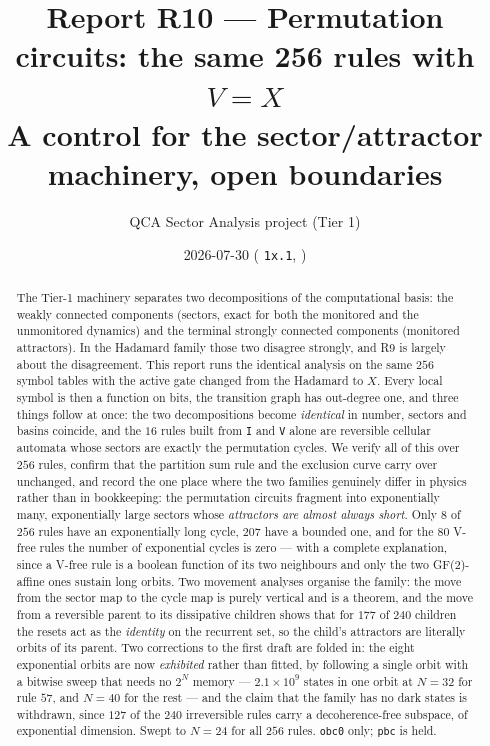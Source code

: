 \documentclass[11pt]{article}
\title{\textbf{Report R10 --- Permutation circuits: the same 256 rules with
$V=X$}\\
\large A control for the sector/attractor machinery, open boundaries}
\author{QCA Sector Analysis project (Tier 1)}
\date{2026-07-30 \quad\small(\fn{xgate\_version} \texttt{1x.1}, \rt{obc0})}
\newcommand{\rt}[1]{\texttt{#1}}
\theoremstyle{plain}
\theoremstyle{definition}
\begin{document}
\maketitle

\begin{abstract}
The Tier-1 machinery separates two decompositions of the computational basis: the
weakly connected components (sectors, exact for both the monitored and the
unmonitored dynamics) and the terminal strongly connected components (monitored
attractors). In the Hadamard family those two disagree strongly, and R9 is largely
about the disagreement. This report runs the identical analysis on the same $256$
symbol tables with the active gate changed from the Hadamard to $X$. Every local
symbol is then a function on bits, the transition graph has out-degree one, and
three things follow at once: the two decompositions become \emph{identical} in
number, sectors and basins coincide, and the $16$ rules built from \rt{I} and
\rt{V} alone are reversible cellular automata whose sectors are exactly the
permutation cycles. We verify all of this over $256$ rules, confirm that the
partition sum rule and the exclusion curve carry over unchanged, and record the
one place where the two families genuinely differ in physics rather than in
bookkeeping: the permutation circuits fragment into exponentially many,
exponentially large sectors whose \emph{attractors are almost always short}. Only
$8$ of $256$ rules have an exponentially long cycle, $207$ have a bounded one,
and for the $80$ V-free rules the number of exponential cycles is zero --- with a
complete explanation, since a V-free rule is a boolean function of its two
neighbours and only the two GF(2)-affine ones sustain long orbits. Two movement
analyses organise the family: the move from the sector map to the cycle map is
purely vertical and is a theorem, and the move from a reversible parent to its
dissipative children shows that for $177$ of $240$ children the resets act as the
\emph{identity} on the recurrent set, so the child's attractors are literally
orbits of its parent. Two corrections to the first draft are folded in: the eight
exponential orbits are now \emph{exhibited} rather than fitted, by following a
single orbit with a bitwise sweep that needs no $2^N$ memory --- $2.1\times10^9$
states in one orbit at $N=32$ for rule $57$, and $N=40$ for the rest --- and the
claim that the family has no dark states is withdrawn, since $127$ of the $240$
irreversible rules carry a decoherence-free subspace, of exponential dimension.
Swept to $N=24$ for all $256$ rules. \rt{obc0} only; \rt{pbc} is held.
\end{abstract}
\end{document}
